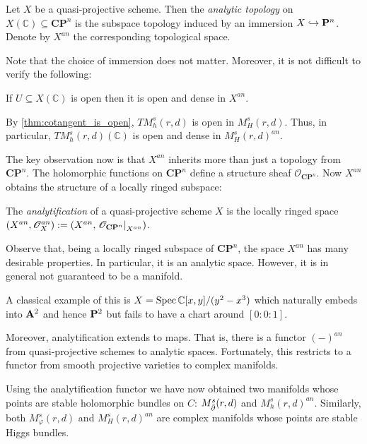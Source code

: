 \documentclass[12pt]{ociamthesis}  %
\begin{document}
\begin{definition}
  Let $X$ be a quasi-projective scheme. Then the \emph{analytic topology} on
  $X(\mathbb C)\subseteq \mathbf{CP}^n$ is the subspace topology induced by an
  immersion $X\hookrightarrow \mathbf P^n$. Denote by $X^{an}$ the corresponding
  topological space.
\end{definition}

Note that the choice of immersion does not matter.
Moreover, it is not difficult to verify the following:

\begin{lemma}
  If $U\subseteq X(\mathbb C)$ is open then it is open and dense in $X^{an}$.
\end{lemma}

\begin{example}
  By \ref{thm:cotangent_is_open}, $TM_h^s(r,d)$ is open in $M_H^s(r,d)$. Thus,
  in particular, $TM_h^s(r,d)(\mathbb C)$ is open and dense in $M^s_H(r,d)^{an}$.
\end{example}

The key observation now is that $X^{an}$ inherits more than just a
topology from $\mathbf{CP}^n$. The holomorphic functions on $\mathbf{CP}^n$
define a structure sheaf $\mathscr O_{\mathbf{CP}^n}$. Now $X^{an}$
obtains the structure of a locally ringed subspace:

\begin{definition}
  The \emph{analytification} of a quasi-projective scheme $X$
  is the locally ringed space
  $(X^{an},\mathscr O_X^{an}) := (X^{an},\left.{\mathscr O_{\mathbf{CP}^n}}\right\vert_{X^{an}})$.
\end{definition}

Observe that, being a locally ringed subspace of $\mathbf{CP}^n$,
the space $X^{an}$ has many desirable properties. In particular, it is
an analytic space. However, it is in general not guaranteed to
be a manifold.

\begin{example}
  A classical example of this is $X=\operatorname{Spec} \mathbb C[x,y]/(y^2-x^3)$
  which naturally embeds into $\mathbf{A}^{2}_{}$ and hence $\mathbf{P}^{2}_{}$
  but fails to have a chart around $[0:0:1]$.
\end{example}

Moreover, analytification extends to maps. That is, there is a
functor $(-)^{an}$ from quasi-projective schemes to analytic spaces.
Fortunately, this restricts to a functor from smooth projective varieties
to complex manifolds.

Using the analytification functor we have now obtained two
manifolds whose points are stable holomorphic bundles on $C$:
$M^s_{\bar{\partial}}(r,d)$ and $M^s_h(r,d)^{an}$. Similarly,
both $M^s_\varphi(r,d)$ and $M^s_H(r,d)^{an}$ are complex manifolds
whose points are stable Higgs bundles.
\end{document}
